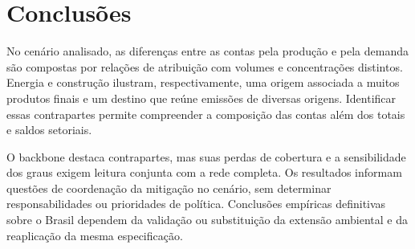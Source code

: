 \documentclass[12pt]{article}
\begin{document}
\section{Conclusões}

No cenário analisado, as diferenças entre as contas pela produção e pela demanda são compostas por relações de atribuição com volumes e concentrações distintos. Energia e construção ilustram, respectivamente, uma origem associada a muitos produtos finais e um destino que reúne emissões de diversas origens. Identificar essas contrapartes permite compreender a composição das contas além dos totais e saldos setoriais.

O backbone destaca contrapartes, mas suas perdas de cobertura e a sensibilidade dos graus exigem leitura conjunta com a rede completa. Os resultados informam questões de coordenação da mitigação no cenário, sem determinar responsabilidades ou prioridades de política. Conclusões empíricas definitivas sobre o Brasil dependem da validação ou substituição da extensão ambiental e da reaplicação da mesma especificação.

{\renewcommand*{\bibfont}{\small}
\printbibliography[title={Referências}]
}

\end{document}

